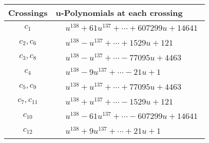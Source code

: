 \documentclass[1p]{elsarticle_modified}
\theoremstyle{definition}
\begin{document}
\begin{tabular}{m{50pt}|m{274pt}}
Crossings & \hspace{64pt}u-Polynomials at each crossing \\
\hline $$\begin{aligned}c_{1}\end{aligned}$$&$\begin{aligned}
&u^{138}+61 u^{137}+\cdots+607299 u+14641
\end{aligned}$\\
\hline $$\begin{aligned}c_{2},c_{6}\end{aligned}$$&$\begin{aligned}
&u^{138}- u^{137}+\cdots+1529 u+121
\end{aligned}$\\
\hline $$\begin{aligned}c_{3},c_{8}\end{aligned}$$&$\begin{aligned}
&u^{138}- u^{137}+\cdots-77095 u+4463
\end{aligned}$\\
\hline $$\begin{aligned}c_{4}\end{aligned}$$&$\begin{aligned}
&u^{138}-9 u^{137}+\cdots-21 u+1
\end{aligned}$\\
\hline $$\begin{aligned}c_{5},c_{9}\end{aligned}$$&$\begin{aligned}
&u^{138}+u^{137}+\cdots+77095 u+4463
\end{aligned}$\\
\hline $$\begin{aligned}c_{7},c_{11}\end{aligned}$$&$\begin{aligned}
&u^{138}+u^{137}+\cdots-1529 u+121
\end{aligned}$\\
\hline $$\begin{aligned}c_{10}\end{aligned}$$&$\begin{aligned}
&u^{138}-61 u^{137}+\cdots-607299 u+14641
\end{aligned}$\\
\hline $$\begin{aligned}c_{12}\end{aligned}$$&$\begin{aligned}
&u^{138}+9 u^{137}+\cdots+21 u+1
\end{aligned}$\\
\hline
\end{tabular}\\~\\
\end{document}
